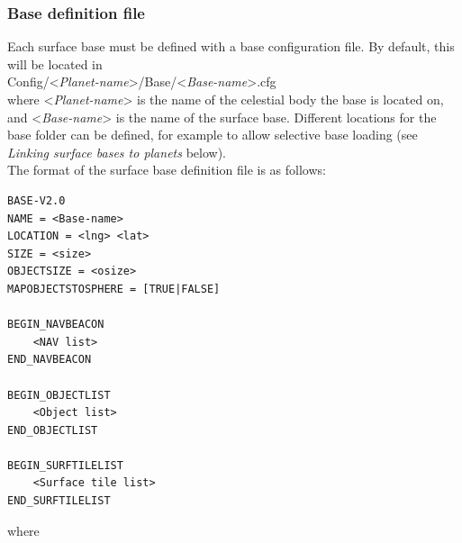 \documentclass[Orbiter Developer Manual.tex]{subfiles}
\begin{document}
\subsubsection*{Base definition file}
Each surface base must be defined with a base configuration file. By default, this will be located in\\
\indent Config/<\textit{Planet-name}>/Base/<\textit{Base-name}>.cfg\\
where <\textit{Planet-name}> is the name of the celestial body the base is located on, and <\textit{Base-name}> is the name of the surface base. Different locations for the base folder can be defined, for example to allow selective base loading (see \textit{Linking surface bases to planets} below).\\
The format of the surface base definition file is as follows:

\begin{lstlisting}[language=OSFS]
BASE-V2.0
NAME = <Base-name>
LOCATION = <lng> <lat>
SIZE = <size>
OBJECTSIZE = <osize>
MAPOBJECTSTOSPHERE = [TRUE|FALSE]

BEGIN_NAVBEACON
	<NAV list>
END_NAVBEACON

BEGIN_OBJECTLIST
	<Object list>
END_OBJECTLIST

BEGIN_SURFTILELIST
	<Surface tile list>
END_SURFTILELIST
\end{lstlisting}

\noindent
where
\end{document}
